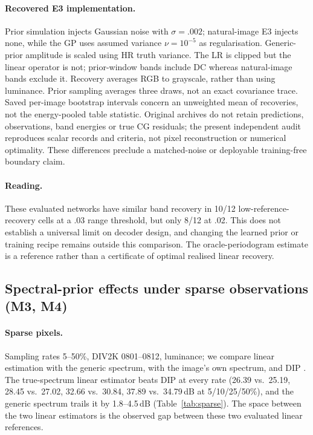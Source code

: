 \paragraph{Recovered E3 implementation.} Prior simulation injects Gaussian noise with $\sigma=.002$; natural-image E3 injects none, while the GP uses assumed variance $\nu=10^{-5}$ as regularisation. Generic-prior amplitude is scaled using HR truth variance. The LR is clipped but the linear operator is not; prior-window bands include DC whereas natural-image bands exclude it. Recovery averages RGB to grayscale, rather than using luminance. Prior sampling averages three draws, not an exact covariance trace. Saved per-image bootstrap intervals concern an unweighted mean of recoveries, not the energy-pooled table statistic. Original archives do not retain predictions, observations, band energies or true CG residuals; the present independent audit reproduces scalar records and criteria, not pixel reconstruction or numerical optimality. These differences preclude a matched-noise or deployable training-free boundary claim.

\paragraph{Reading.} These evaluated networks have similar band recovery
in 10/12 low-reference-recovery cells at a .03 range threshold, but only
8/12 at .02. This does not establish a universal limit on decoder design,
and changing the learned prior or training recipe remains outside this
comparison. The oracle-periodogram estimate is a reference rather than a
certificate of optimal realised linear recovery.

\subsection{Spectral-prior effects under sparse observations (M3, M4)}\label{sec:exp-b}

\paragraph{Sparse pixels.} Sampling rates 5--50\%, DIV2K 0801--0812,
luminance; we compare linear estimation with the generic spectrum, with the
image's own spectrum, and DIP \citep{ulyanov2018dip} . The true-spectrum linear estimator beats DIP at every rate
(26.39 vs.\ 25.19, 28.45 vs.\ 27.02, 32.66 vs.\ 30.84, 37.89 vs.\ 34.79\,dB at
5/10/25/50\%), and the generic spectrum trails it by 1.8--4.5\,dB
(Table~\ref{tab:sparse}). The space between the two linear estimators is the observed gap between these two evaluated linear references.

